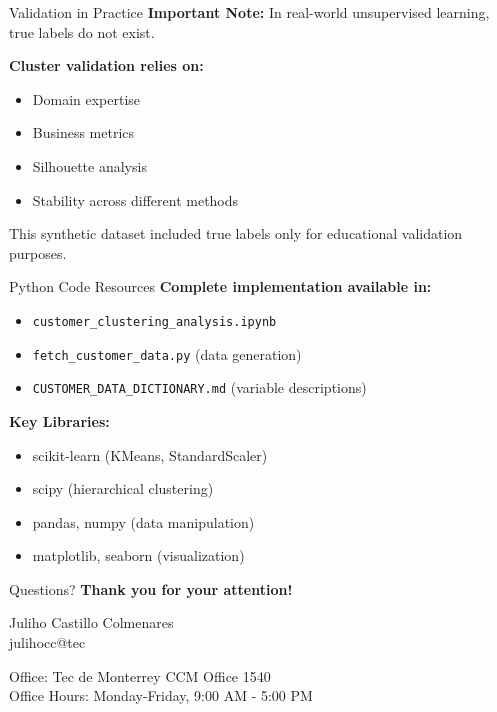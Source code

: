 \documentclass[aspectratio=169,ignorenonframetext]{beamer}
\begin{document}
\begin{frame}{Validation in Practice}
\textbf{Important Note:} In real-world unsupervised learning, true
labels do not exist.

\textbf{Cluster validation relies on:}

\begin{itemize}
\item
  Domain expertise
\item
  Business metrics
\item
  Silhouette analysis
\item
  Stability across different methods
\end{itemize}

This synthetic dataset included true labels only for educational
validation purposes.
\end{frame}

\begin{frame}[fragile]{Python Code Resources}
\textbf{Complete implementation available in:}

\begin{itemize}
\item
  \texttt{customer\_clustering\_analysis.ipynb}
\item
  \texttt{fetch\_customer\_data.py} (data generation)
\item
  \texttt{CUSTOMER\_DATA\_DICTIONARY.md} (variable descriptions)
\end{itemize}

\textbf{Key Libraries:}

\begin{itemize}
\item
  scikit-learn (KMeans, StandardScaler)
\item
  scipy (hierarchical clustering)
\item
  pandas, numpy (data manipulation)
\item
  matplotlib, seaborn (visualization)
\end{itemize}
\end{frame}

\begin{frame}{Questions?}
\textbf{ Thank you for your attention! }

Juliho Castillo Colmenares\\
julihocc@tec

Office: Tec de Monterrey CCM Office 1540\\
Office Hours: Monday-Friday, 9:00 AM - 5:00 PM
\end{frame}
\end{document}
